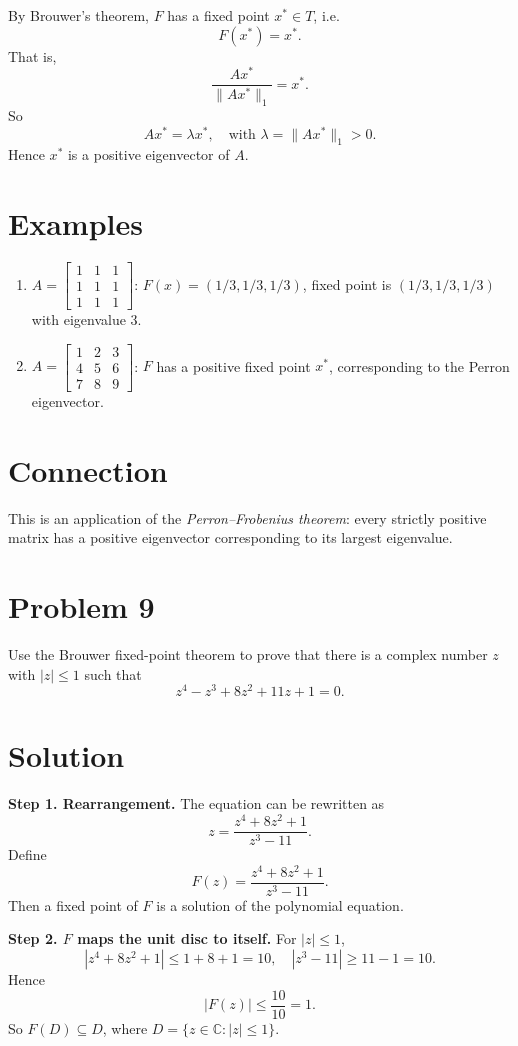 \documentclass[11pt,a4paper]{article}
\theoremstyle{definition}
\theoremstyle{definition}
\theoremstyle{plain}
\theoremstyle{remark}
\begin{document}
By Brouwer’s theorem, $F$ has a fixed point $x^*\in T$, i.e.
\[
F(x^*) = x^*.
\]
That is,
\[
\frac{Ax^*}{\|Ax^*\|_1} = x^*.
\]
So
\[
Ax^* = \lambda x^*, \quad \text{with } \lambda = \|Ax^*\|_1>0.
\]
Hence $x^*$ is a positive eigenvector of $A$.

\section*{Examples}
\begin{enumerate}
	\item $A=\begin{bmatrix}1&1&1\\1&1&1\\1&1&1\end{bmatrix}$:  
	$F(x)=(1/3,1/3,1/3)$, fixed point is $(1/3,1/3,1/3)$ with eigenvalue $3$.
	\item $A=\begin{bmatrix}1&2&3\\4&5&6\\7&8&9\end{bmatrix}$:  
	$F$ has a positive fixed point $x^*$, corresponding to the Perron eigenvector.
\end{enumerate}

\section*{Connection}
This is an application of the \emph{Perron--Frobenius theorem}: every strictly positive matrix has a positive eigenvector corresponding to its largest eigenvalue.

\section*{Problem 9}
Use the Brouwer fixed-point theorem to prove that there is a complex number $z$ with $|z|\leq 1$ such that
\[
z^4 - z^3 + 8z^2 + 11z + 1 = 0.
\]

\section*{Solution}
\textbf{Step 1. Rearrangement.}  
The equation can be rewritten as
\[
z = \frac{z^4 + 8z^2 + 1}{z^3 - 11}.
\]
Define
\[
F(z) = \frac{z^4 + 8z^2 + 1}{z^3 - 11}.
\]
Then a fixed point of $F$ is a solution of the polynomial equation.

\medskip

\textbf{Step 2. $F$ maps the unit disc to itself.}  
For $|z|\leq 1$,
\[
|z^4 + 8z^2 + 1| \leq 1 + 8 + 1 = 10, \quad
|z^3 - 11| \geq 11 - 1 = 10.
\]
Hence
\[
|F(z)| \leq \frac{10}{10} = 1.
\]
So $F(D) \subseteq D$, where $D=\{z\in\mathbb{C}:|z|\leq 1\}$.
\end{document}
